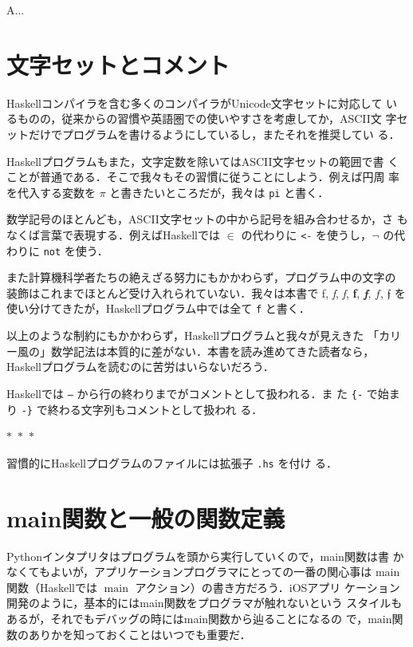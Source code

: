 \documentclass[a5paper,twoside,fleqn,draft]{jsbook}
\newcommand{\separator}{\begin{center}$*$~$*$~$*$\end{center}}
\newcommand{\programminglanguage}[1]{\textsf{#1}}
\newcommand{\haskell}{\programminglanguage{Haskell}}
\newcommand{\python}{\programminglanguage{Python}}
\newenvironment{leader}{\begingroup\gt}{\endgroup}
\newcommand{\code}[1]{\texttt{#1}}
\newcommand{\filename}[1]{\texttt{#1}}
\newcommand{\mAction}[1]{\mathrm{#1}}
\DeclareMathOperator{\mMain}{\mAction{main}}
\DeclareMathOperator{\mFrom}{\in}
\begin{document}
\begin{leader}
A...
\end{leader}

\section{文字セットとコメント}

\haskell コンパイラを含む多くのコンパイラがUnicode文字セットに対応して
いるものの，従来からの習慣や英語圏での使いやすさを考慮してか，ASCII文
字セットだけでプログラムを書けるようにしているし，またそれを推奨してい
る．

\haskell プログラムもまた，文字定数を除いてはASCII文字セットの範囲で書
くことが普通である．そこで我々もその習慣に従うことにしよう．例えば円周
率を代入する変数を $\pi$ と書きたいところだが，我々は \code{pi} と書く．

数学記号のほとんども，ASCII文字セットの中から記号を組み合わせるか，さ
もなくば言葉で表現する．例えば\haskell では $\mFrom$ の代わりに
\code{<-} を使うし，$\neg$ の代わりに \code{not} を使う．

また計算機科学者たちの絶えざる努力にもかかわらず，プログラム中の文字の
装飾はこれまでほとんど受け入れられていない．我々は本書で \textrm{f},
\textit{f}, \textsl{f}, \textbf{f}, \textbf{\textit{f}}, $f$,
$\mathfrak{f}$ を使い分けてきたが，\haskell プログラム中では全て
\code{f} と書く．

以上のような制約にもかかわらず，\haskell プログラムと我々が見えきた
「カリー風の」数学記法は本質的に差がない．本書を読み進めてきた読者なら，
\haskell プログラムを読むのに苦労はいらないだろう．

\haskell では \code{--} から行の終わりまでがコメントとして扱われる．ま
た \code{\{-} で始まり \code{-\}} で終わる文字列もコメントとして扱われ
る．

\separator

習慣的に\haskell プログラムのファイルには拡張子 \filename{.hs} を付け
る．

\section{main関数と一般の関数定義}

\python インタプリタはプログラムを頭から実行していくので，main関数は書
かなくてもよいが，アプリケーションプログラマにとっての一番の関心事は
main関数（\haskell では $\mMain$ アクション）の書き方だろう．iOSアプリ
ケーション開発のように，基本的にはmain関数をプログラマが触れないという
スタイルもあるが，それでもデバッグの時にはmain関数から辿ることになるの
で，main関数のありかを知っておくことはいつでも重要だ．
\end{document}
